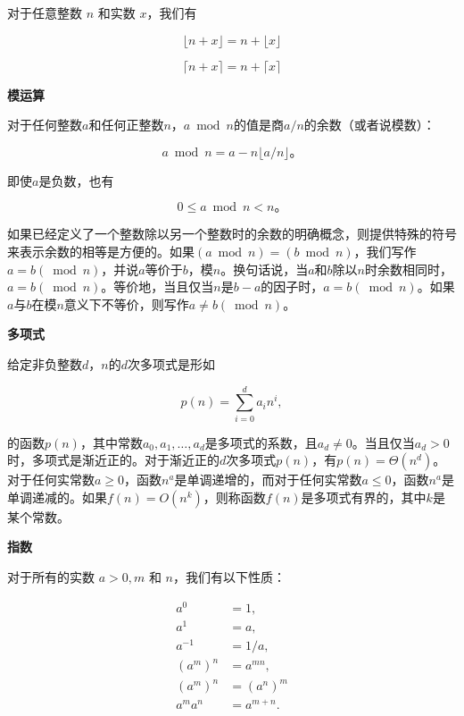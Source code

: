 \documentclass[lang=cn,newtx,10pt,scheme=chinese]{elegantbook}
\begin{document}
对于任意整数 $n$ 和实数 $x$，我们有

\begin{equation}\label{eq:3.9}
\lfloor n+x\rfloor=n+\lfloor x\rfloor
\end{equation}

\begin{equation}\label{eq:3.10}
\lceil n+x\rceil=n+\lceil x\rceil
\end{equation}

\textbf{模运算}

对于任何整数$a$和任何正整数$n$，$a \bmod n$的值是商$a / n$的余数（或者说模数）：

\begin{equation}\label{eq:3.11}
a \bmod n=a-n\lfloor a / n\rfloor。
\end{equation}

即使$a$是负数，也有

\begin{equation}\label{eq:3.12}
0 \leq a \bmod n<n。
\end{equation}

如果已经定义了一个整数除以另一个整数时的余数的明确概念，则提供特殊的符号来表示余数的相等是方便的。如果$(a \bmod n)=(b \bmod n)$，我们写作$a=b(\bmod n)$，并说$a$等价于$b$，模$n$。换句话说，当$a$和$b$除以$n$时余数相同时，$a=b(\bmod n)$。等价地，当且仅当$n$是$b-a$的因子时，$a=b(\bmod n)$。如果$a$与$b$在模$n$意义下不等价，则写作$a \neq b(\bmod n)$。

\textbf{多项式}

给定非负整数$d$，$n$的$d$次多项式是形如

$$
p(n)=\sum_{i=0}^d a_i n^i,
$$

的函数$p(n)$，其中常数$a_0, a_1, \ldots, a_d$是多项式的系数，且$a_d \neq 0$。当且仅当$a_d>0$时，多项式是渐近正的。对于渐近正的$d$次多项式$p(n)$，有$p(n)=\Theta(n^d)$。对于任何实常数$a \geq 0$，函数$n^a$是单调递增的，而对于任何实常数$a \leq 0$，函数$n^a$是单调递减的。如果$f(n)=O(n^k)$，则称函数$f(n)$是多项式有界的，其中$k$是某个常数。

\textbf{指数}

对于所有的实数 $a>0, m$ 和 $n$，我们有以下性质：

$$
\begin{aligned}
a^0 & =1, \\
a^1 & =a, \\
a^{-1} & =1 / a, \\
(a^m)^n & =a^{m n}, \\
(a^m)^n & =(a^n)^m \\
a^m a^n & =a^{m+n} .
\end{aligned}
$$
\end{document}
